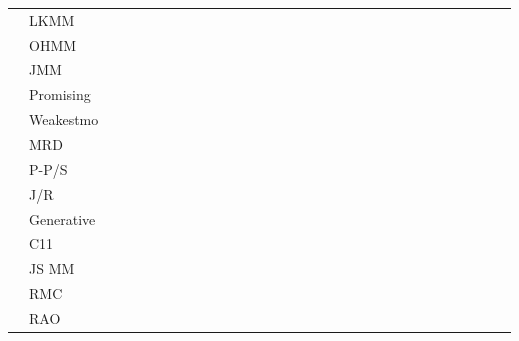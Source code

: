 \begin{landscape}
\begin{table*}
\begin{tabular}{|c|l|c|c|c|c|c|c|c|c|c|c|c|c|c|c|c|c|c|c|c|c|c|c|c|c|c|c|c|c|c|}

 & LKMM           & & & & & & & & & & & & & & & & & & & & & & & & & & & & & \\ 

 & OHMM           & & & & & & & & & & & & & & & & & & & & & & & & & & & & & \\ \Xhline{2\arrayrulewidth}


 & JMM            & & & & & & & & & & & & & & & & & & & & & & & & & & & & & \\ 

 & Promising      & & & & & & & & & & & & & & & & & & & & & & & & & & & & & \\ 

 & Weakestmo      & & & & & & & & & & & & & & & & & & & & & & & & & & & & & \\ 

 & MRD            & & & & & & & & & & & & & & & & & & & & & & & & & & & & & \\ 

 & P-P/S          & & & & & & & & & & & & & & & & & & & & & & & & & & & & & \\ 

 & J/R            & & & & & & & & & & & & & & & & & & & & & & & & & & & & & \\ 

 & Generative     & & & & & & & & & & & & & & & & & & & & & & & & & & & & & \\ \Xhline{2\arrayrulewidth}


 & C11            & & & & & & & & & & & & & & & & & & & & & & & & & & & & & \\ 

 & JS MM          & & & & & & & & & & & & & & & & & & & & & & & & & & & & & \\ 

 & RMC            & & & & & & & & & & & & & & & & & & & & & & & & & & & & & \\ 

 & RAO            & & & & & & & & & & & & & & & & & & & & & & & & & & & & & \\ 


\end{tabular}
\end{table*}
\end{landscape}
